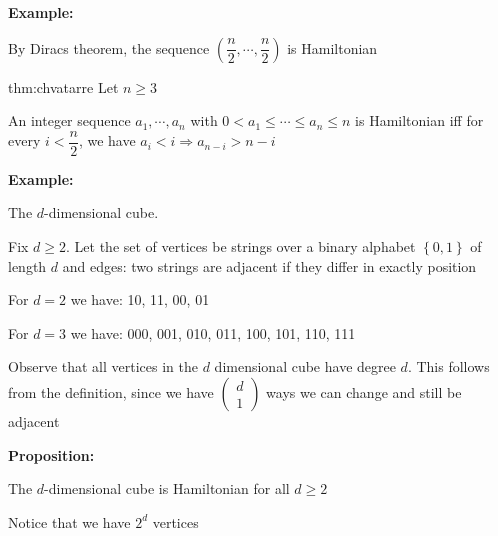 \par\bigskip
\noindent\textbf{Example:}\par
\noindent By Diracs theorem, the sequence $\left(\dfrac{n}{2},\cdots, \dfrac{n}{2}\right)$ is Hamiltonian
\par\bigskip
\begin{theo}[Chvatal]{thm:chvatarre}
  Let $n\geq3$\par
  \noindent An integer sequence $a_1,\cdots,a_n$ with $0<a_1\leq\cdots\leq a_n\leq n$ is Hamiltonian iff for every $i<\dfrac{n}{2}$, we have $a_i<i\Rightarrow a_{n-i}>n-i$
\end{theo}
\par\bigskip
\noindent\textbf{Example:}\par
\noindent The $d$-dimensional cube.\par
\noindent Fix $d\geq2$. Let the set of vertices be strings over a binary alphabet $\left\{0,1\right\}$ of length $d$ and edges: two strings are adjacent if they differ in exactly position
\par\bigskip
\noindent For $d = 2$ we have: 10, 11, 00, 01\par
\noindent For $d = 3$ we have: 000, 001, 010, 011, 100, 101, 110, 111
\par\bigskip
\noindent Observe that all vertices in the $d$ dimensional cube have degree $d$. This follows from the definition, since we have $\begin{pmatrix}d\\1\end{pmatrix}$ ways we can change and still be adjacent
\par\bigskip
\noindent\textbf{Proposition:}\par
\noindent The $d$-dimensional cube is Hamiltonian for all $d\geq2$
\par\bigskip
\noindent Notice that we have $2^d$ vertices
\par\bigskip
